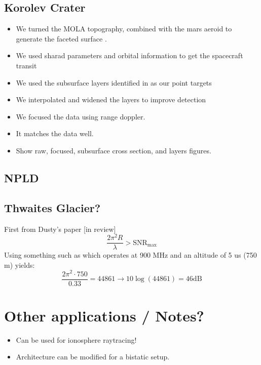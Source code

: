 \documentclass[lettersize,journal]{IEEEtran}
\begin{document}
\subsection{Korolev Crater}
\begin{itemize}
    \item We turned the MOLA topography, combined with the mars aeroid to generate the faceted surface \cite{smith_mars_2001}.
    \item We used sharad parameters and orbital information to get the spacecraft transit
    \item We used the subsurface layers identified in \cite{brothers_threedimensional_2016} as our point targets
    \item We interpolated and widened the layers to improve detection
    \item We focused the data using range doppler. 
    \item It matches the data well. 
    \item Show raw, focused, subsurface cross section, and layers figures.
\end{itemize}

\subsection{NPLD}

\subsection{Thwaites Glacier?}
First from Dusty's paper [in review]
\begin{equation}
    \frac{2\pi^2R}{\lambda} > \mathrm{SNR_{max}}
\end{equation}
Using something such as \cite{kaundinya_multi-channel_2024} which operates at 900 MHz and an altitude of 5 us (750 m) yields:
\begin{equation}
    \frac{2\pi^2\cdot750}{0.33}=44861\rightarrow10\log(44861)=46\mathrm{dB}
\end{equation}


\section{Other applications / Notes?}
\begin{itemize}
    \item Can be used for ionosphere raytracing!
    \item Architecture can be modified for a bistatic setup.
\end{itemize}
\end{document}
